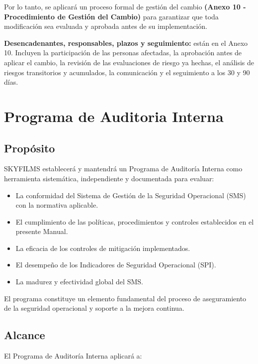  Por lo tanto, se aplicará un proceso formal de gestión del cambio \textbf{(Anexo 10 - Procedimiento de Gestión del Cambio)} para garantizar que toda modificación sea evaluada y aprobada antes de su implementación.


\textbf{Desencadenantes, responsables, plazos y seguimiento:} están en el Anexo 10. Incluyen la participación de las personas afectadas, la aprobación antes de aplicar el cambio, la revisión de las evaluaciones de riesgo ya hechas, el análisis de riesgos transitorios y acumulados, la comunicación y el seguimiento a los 30 y 90 días.

\section{Programa de Auditoria Interna}

\subsection{Propósito}

SKYFILMS establecerá y mantendrá un Programa de Auditoría Interna como herramienta sistemática, independiente y documentada para evaluar:

\begin{itemize}
    \item La conformidad del Sistema de Gestión de la Seguridad Operacional (SMS) con la normativa aplicable.

    \item El cumplimiento de las políticas, procedimientos y controles establecidos en el presente Manual.

    \item La eficacia de los controles de mitigación implementados.

    \item El desempeño de los Indicadores de Seguridad Operacional (SPI).

    \item La madurez y efectividad global del SMS.
\end{itemize}

El programa constituye un elemento fundamental del proceso de aseguramiento de la seguridad operacional y soporte a la mejora continua.

\subsection{Alcance}
El Programa de Auditoría Interna aplicará a:

